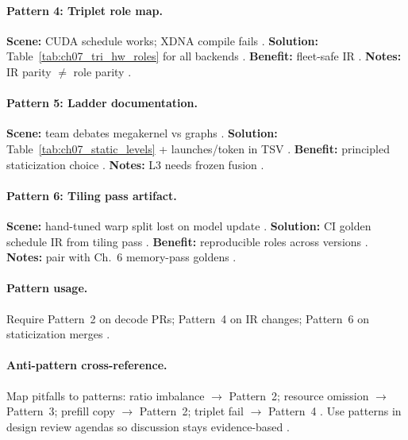 \paragraph{Pattern 4: Triplet role map.}
\textbf{Scene:} CUDA schedule works; XDNA compile fails \citep{amd2024xdna,taxbreak2026}.
\textbf{Solution:} Table~\ref{tab:ch07_tri_hw_roles} for all backends \citep{yirage2026,patel2025llminference,chen2020compilerbasedhardw}.
\textbf{Benefit:} fleet-safe IR \citep{amd2024aie,nvidia2022hopper}.
\textbf{Notes:} IR parity $\neq$ role parity \citep{yirage2026}.

\paragraph{Pattern 5: Ladder documentation.}
\textbf{Scene:} team debates megakernel vs graphs \citep{mpk2025,nvidia2024cudagraphs}.
\textbf{Solution:} Table~\ref{tab:ch07_static_levels} + launches/token in TSV \citep{taxbreak2026,patel2025llminference}.
\textbf{Benefit:} principled staticization choice \citep{yirage2026}.
\textbf{Notes:} L3 needs frozen fusion \citep{wu2024mirage,mpk2025}.

\paragraph{Pattern 6: Tiling pass artifact.}
\textbf{Scene:} hand-tuned warp split lost on model update \citep{shah2024flashattention3,yirage2026}.
\textbf{Solution:} CI golden schedule IR from tiling pass \citep{wu2024mirage,chen2020compilerbasedhardw}.
\textbf{Benefit:} reproducible roles across versions \citep{patel2025llminference,mpk2025}.
\textbf{Notes:} pair with Ch.~6 memory-pass goldens \citep{yirage2026,dao2022flashattention}.

\paragraph{Pattern usage.}
Require Pattern~2 on decode PRs; Pattern~4 on IR changes; Pattern~6 on staticization merges \citep{yirage2026,taxbreak2026,shah2024flashattention3,patel2025llminference,chen2020compilerbasedhardw}.

\paragraph{Anti-pattern cross-reference.}
Map pitfalls to patterns: ratio imbalance $\rightarrow$ Pattern~2; resource omission $\rightarrow$ Pattern~3; prefill copy $\rightarrow$ Pattern~2; triplet fail $\rightarrow$ Pattern~4 \citep{yirage2026,shah2024flashattention3,amd2024xdna,patel2025llminference}.
Use patterns in design review agendas so discussion stays evidence-based \citep{chen2020compilerbasedhardw,taxbreak2026,memoryfloor2026}.

